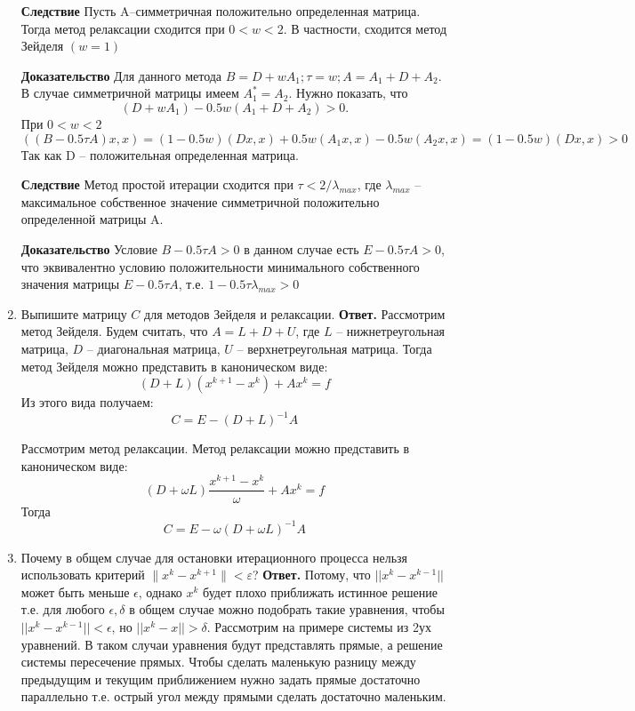 \documentclass{article}
\begin{document}
\begin{enumerate}
		
	\textbf{Следствие} Пусть A--симметричная положительно определенная матрица. Тогда метод релаксации сходится при $0<w<2$. В частности, сходится метод Зейделя $(w=1)$
 
	\textbf{Доказательство} Для данного метода $B=D+wA_1; \tau =w; A=A_1+D+A_2$. В случае симметричной матрицы имеем $A_1^*=A_2$. Нужно показать, что
	\[
	(D+wA_1)-0.5w(A_1+D+A_2)>0.
	\]
	При $0<w<2$
	\[
	((B-0.5\tau A)x,x) = (1-0.5w)(Dx,x)+0.5w(A_1x,x) -0.5w(A_2x,x)=(1-0.5w)(Dx,x) >0
	\]
	Так как D -- положительная определенная матрица.
	
	\textbf{Следствие} Метод простой итерации сходится при $\tau < 2/\lambda_{max}$, где $\lambda_{max}$ -- максимальное собственное значение симметричной положительно определенной матрицы A.
	
	\textbf{Доказательство} Условие $B-0.5 \tau A >0$ в данном случае есть $E-0.5 \tau A >0$, что эквивалентно условию положительности минимального собственного значения матрицы $E-0.5 \tau A$, т.е. $1-0.5 \tau \lambda_{max} >0$

        \item Выпишите матрицу $C$ для методов Зейделя и релаксации.
        \newline
        {\bfseries Ответ.} 
        Рассмотрим метод Зейделя.
        Будем считать, что $A = L + D + U$, где $L$ -- нижнетреугольная матрица, $D$ -- 
        диагональная матрица, $U$ -- верхнетреугольная матрица.
        Тогда метод Зейделя можно представить в каноническом виде: 
        \begin{equation*}
            (D + L)(x^{k+1} -x^k) + Ax^k = f
        \end{equation*}
        Из этого вида получаем:
        \begin{equation*}
            C = E - (D+L)^{-1}A
        \end{equation*}

        Рассмотрим метод релаксации.
        Метод релаксации можно представить в каноническом виде: 
        \begin{equation*}
            (D + \omega L)\frac{x^{k+1} -x^k}{\omega} + Ax^k = f
        \end{equation*}
        Тогда 
        \begin{equation*}
            C = E - \omega(D+\omega L)^{-1}A
        \end{equation*}
        \item Почему в общем случае для остановки итерационного
        процесса нельзя использовать критерий $\|x^k - x^{k+1}\| < \varepsilon$?
        \newline
        {\bfseries Ответ.}
        Потому, что $||x^{k}-x^{k-1}||$ может быть меньше $\epsilon$, однако $x^k$ будет плохо приближать истинное решение т.е. для любого $\epsilon, \delta$ в общем случае можно подобрать такие уравнения, чтобы  $||x^{k}-x^{k-1}|| < \epsilon$, но $||x^{k}-x|| > \delta$. Рассмотрим на примере системы из 2ух уравнений. В таком случаи уравнения будут представлять прямые, а решение системы пересечение прямых. Чтобы сделать маленькую разницу между предыдущим и текущим приближением нужно задать прямые достаточно параллельно т.е. острый угол между прямыми сделать достаточно маленьким.


\end{enumerate}
\end{document}
